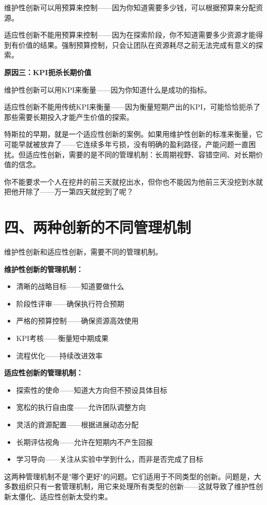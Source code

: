 维护性创新可以用预算来控制——因为你知道需要多少钱，可以根据预算来分配资源。

适应性创新不能用预算来控制——因为在探索阶段，你不知道需要多少资源才能得到有价值的结果。强制预算控制，只会让团队在资源耗尽之前无法完成有意义的探索。

\textbf{原因三：KPI扼杀长期价值}

维护性创新可以用KPI来衡量——因为你知道什么是成功的指标。

适应性创新不能用传统KPI来衡量——因为衡量短期产出的KPI，可能恰恰扼杀了那些需要长期投入才能产生价值的探索。

特斯拉的早期，就是一个适应性创新的案例。如果用维护性创新的标准来衡量，它可能早就被放弃了——它连续多年亏损，没有明确的盈利路径，产能问题一直困扰。但适应性创新，需要的是不同的管理机制：长周期视野、容错空间、对长期价值的信念。

你不能要求一个人在挖井的前三天就挖出水，但你也不能因为他前三天没挖到水就把他开除了——万一第四天就挖到了呢？

\section{四、两种创新的不同管理机制}


维护性创新和适应性创新，需要不同的管理机制。

\textbf{维护性创新的管理机制：}

\begin{itemize}
\item 清晰的战略目标——知道要做什么
\item 阶段性评审——确保执行符合预期
\item 严格的预算控制——确保资源高效使用
\item KPI考核——衡量短中期成果
\item 流程优化——持续改进效率

\end{itemize}
\textbf{适应性创新的管理机制：}

\begin{itemize}
\item 探索性的使命——知道大方向但不预设具体目标
\item 宽松的执行自由度——允许团队调整方向
\item 灵活的資源配置——根据进展动态分配
\item 长期评估视角——允许在短期内不产生回报
\item 学习导向——关注从实验中学到什么，而非是否完成了目标

\end{itemize}
这两种管理机制不是"哪个更好"的问题。它们适用于不同类型的创新。问题是，大多数组织只有一套管理机制，用它来处理所有类型的创新——这就导致了维护性创新太僵化、适应性创新太受约束。

